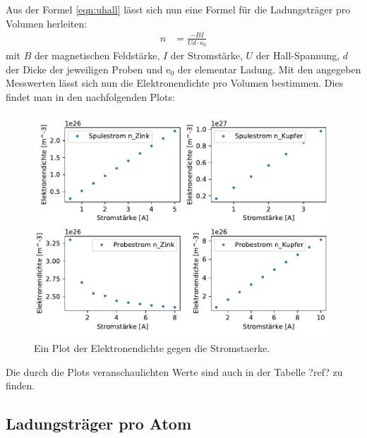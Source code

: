     \noindent
    Aus der Formel \ref{eqn:uhall} lässt sich nun eine Formel für die Ladungsträger pro Volumen herleiten:
    \begin{align}
        n &= \frac{-BI}{Ud\cdot\text{e}_0}
    \end{align}
    mit $B$ der magnetischen Feldstärke, $I$ der Stromstärke, $U$ der Hall-Spannung, $d$ der Dicke der jeweiligen Proben und $\text{e}_0$ der 
    elementar Ladung.
    \noindent
    Mit den angegeben Messwerten lässt sich nun die Elektronendichte pro Volumen bestimmen. Dies findet man in den nachfolgenden Plots:
    \begin{figure}[H]
        \centering
        \includegraphics[width=1.1\textwidth]{build/N.pdf}
        \caption{Ein Plot der Elektronendichte gegen die Stromstaerke.}
        \label{img:elekdichte}
    \end{figure}
    \noindent
    Die durch die Plots veranschaulichten Werte sind auch in der Tabelle ?ref? zu finden.


    \subsection{Ladungsträger pro Atom}


